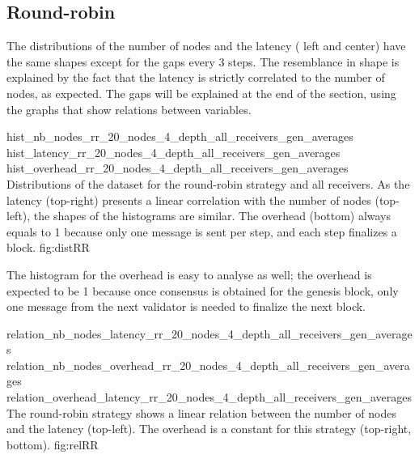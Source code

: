 \subsection{Round-robin}
\FloatBarrier

The distributions of the number of nodes and the latency
( left and center) have the same
shapes except for the gaps every 3 steps. The resemblance in shape is explained
by the fact that the latency is strictly correlated to the number of nodes, as
expected.
The gaps will be explained at the end of the section, using the graphs that show
relations between variables.

\triplefigure
    {hist_nb_nodes_rr_20_nodes_4_depth_all_receivers_gen_averages}
    {hist_latency_rr_20_nodes_4_depth_all_receivers_gen_averages}
    {hist_overhead_rr_20_nodes_4_depth_all_receivers_gen_averages}
    {Distributions of the dataset for the round-robin strategy and all
    receivers. As the latency (top-right) presents a linear correlation with the number of
    nodes (top-left), the shapes of the histograms are similar. The overhead
    (bottom) always
    equals to 1 because only one message is sent per step, and each step
    finalizes a block.}
    {fig:distRR}

The histogram for the overhead is easy to analyse as well; the overhead is
expected to be 1 because once consensus is obtained for the genesis block, only
one message from the next validator is needed to finalize the next block.

\triplefigure
    {relation_nb_nodes_latency_rr_20_nodes_4_depth_all_receivers_gen_averages}
    {relation_nb_nodes_overhead_rr_20_nodes_4_depth_all_receivers_gen_averages}
    {relation_overhead_latency_rr_20_nodes_4_depth_all_receivers_gen_averages}
    {The round-robin strategy shows a linear relation between the number of
    nodes and the latency (top-left). The overhead is a constant for this
    strategy (top-right, bottom).}
    {fig:relRR}

